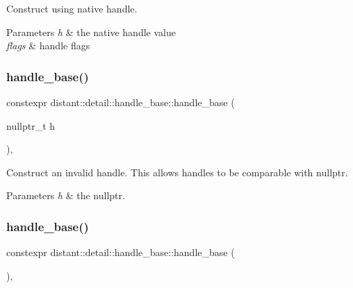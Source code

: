 Construct using native handle. 
\begin{DoxyParams}{Parameters}
{\em h} & the native handle value \\
\hline
{\em flags} & handle flags \\
\hline
\end{DoxyParams}
\mbox{\label{classdistant_1_1detail_1_1handle__base_a1a7acece6f6efdf438c2e5092451c8ec}} 
\subsubsection{\texorpdfstring{handle\+\_\+base()}{handle\_base()}\hspace{0.1cm}{\footnotesize\ttfamily [2/3]}}
{\footnotesize\ttfamily constexpr distant\+::detail\+::handle\+\_\+base\+::handle\+\_\+base (\begin{DoxyParamCaption}\item[{nullptr\+\_\+t}]{h }\end{DoxyParamCaption})\hspace{0.3cm}{\ttfamily [inline]}, {\ttfamily [noexcept]}}

Construct an invalid handle. This allows handles to be comparable with nullptr. 
\begin{DoxyParams}{Parameters}
{\em h} & the nullptr. \\
\hline
\end{DoxyParams}
\mbox{\label{classdistant_1_1detail_1_1handle__base_aab5ad3c3cd411c27b87da8187ea51447}} 
\subsubsection{\texorpdfstring{handle\+\_\+base()}{handle\_base()}\hspace{0.1cm}{\footnotesize\ttfamily [3/3]}}
{\footnotesize\ttfamily constexpr distant\+::detail\+::handle\+\_\+base\+::handle\+\_\+base (\begin{DoxyParamCaption}{ }\end{DoxyParamCaption})\hspace{0.3cm}{\ttfamily [inline]}, {\ttfamily [noexcept]}}

